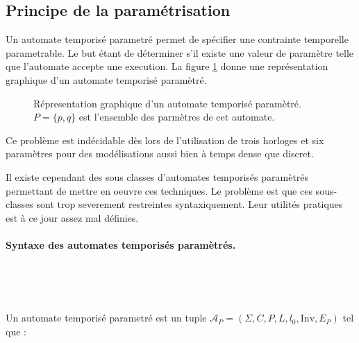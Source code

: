 \documentclass{article}
\begin{document}
    \subsection{Principe de la paramétrisation}
    
      Un automate temporisé parametré permet de spécifier une contrainte
      temporelle parametrable. Le but étant de déterminer s'il existe une valeur
      de paramètre telle que l'automate accepte une execution. La figure
      \ref{fig:automate-tempo-param} donne une représentation graphique d'un
      automate temporisé paramètré.

      \begin{figure}
        \centering \small
        \caption{Répresentation graphique d'un automate temporisé paramètré. \\
          $P = \{ p, q \}$ est l'ensemble des parmètres de cet automate.}
        \label{fig:automate-tempo-param}
      \end{figure}

      Ce problème est indécidable dès lors de l'utilisation de trois horloges et
      six paramètres pour des modélisations aussi bien à temps dense que
      discret.

      Il existe cependant des sous classes d'automates temporisés paramètrés
      permettant de mettre en oeuvre ces techniques. Le problème est que ces
      sous-classes sont trop severement restreintes syntaxiquement. Leur
      utilités pratiques est à ce jour assez mal définies.

      \paragraph{Syntaxe des automates temporisés paramètrés.} ~

        ~
      
        \noindent
        Un automate temporisé parametré est un tuple $\mathcal{A}_P =
        (\Sigma,C,P,L,l_0,\mathrm{Inv},E_P)$ tel que :
    
\end{document}
